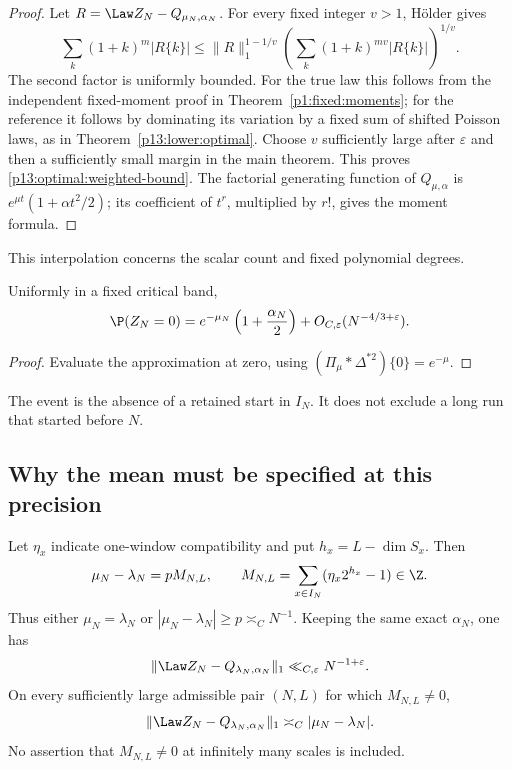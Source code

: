 \begin{proof}
Let \(R=\Law Z_N-Q_{\mu_N,\alpha_N}\).
For every fixed integer \(v>1\), H\"older gives
\[
 \sum_k(1+k)^m|R\{k\}|
 \le\|R\|_1^{1-1/v}
       \left(\sum_k(1+k)^{mv}|R\{k\}|\right)^{1/v}.
\]
The second factor is uniformly bounded.
For the true law this follows from the independent
fixed-moment proof in Theorem~\ref{p1:fixed:moments};
for the reference it follows by dominating its variation
by a fixed sum of shifted Poisson laws, as in
Theorem~\ref{p13:lower:optimal}.
Choose \(v\) sufficiently large after \(\varepsilon\)
and then a sufficiently small margin in the main theorem.
This proves \eqref{p13:optimal:weighted-bound}.
The factorial generating function of \(Q_{\mu,\alpha}\)
is \(e^{\mu t}(1+\alpha t^2/2)\); its coefficient of
\(t^r\), multiplied by \(r!\), gives the moment formula.
\end{proof}

This interpolation concerns the scalar count and fixed polynomial degrees.

\begin{corollary}
\label{p13:optimal:zero}
Uniformly in a fixed critical band,
\[
 \P(Z_N=0)
   =e^{-\mu_N}\left(1+\frac{\alpha_N}{2}\right)
          +O_{C,\varepsilon}(N^{-4/3+\varepsilon}).
\]
\end{corollary}

\begin{proof}
Evaluate the approximation at zero, using
\((\Pi_\mu*\Delta^{*2})\{0\}=e^{-\mu}\).
\end{proof}

The event is the absence of a retained start in \(I_N\).
It does not exclude a long run that started before \(N\).

\subsection{Why the mean must be specified at this precision}

\begin{proposition}
\label{p13:optimal:nominal}
Let \(\eta_x\) indicate one-window compatibility and put
\(h_x=L-\dim S_x\). Then
\begin{equation}
 \mu_N-\lambda_N=pM_{N,L},\qquad
 M_{N,L}=\sum_{x\in I_N}(\eta_x2^{h_x}-1)\in\Z.
 \label{p13:optimal:integer-mean}
\end{equation}
Thus either \(\mu_N=\lambda_N\) or
\(|\mu_N-\lambda_N|\ge p\asymp_C N^{-1}\).
Keeping the same exact \(\alpha_N\), one has
\[
 \|\Law Z_N-Q_{\lambda_N,\alpha_N}\|_1
       \ll_{C,\varepsilon}N^{-1+\varepsilon}.
\]
On every sufficiently large admissible pair \((N,L)\)
for which \(M_{N,L}\ne0\),
\begin{equation}
 \|\Law Z_N-Q_{\lambda_N,\alpha_N}\|_1
       \asymp_C|\mu_N-\lambda_N|.
 \label{p13:optimal:nominal-distance}
\end{equation}
No assertion that \(M_{N,L}\ne0\) at infinitely many
scales is included.
\end{proposition}

